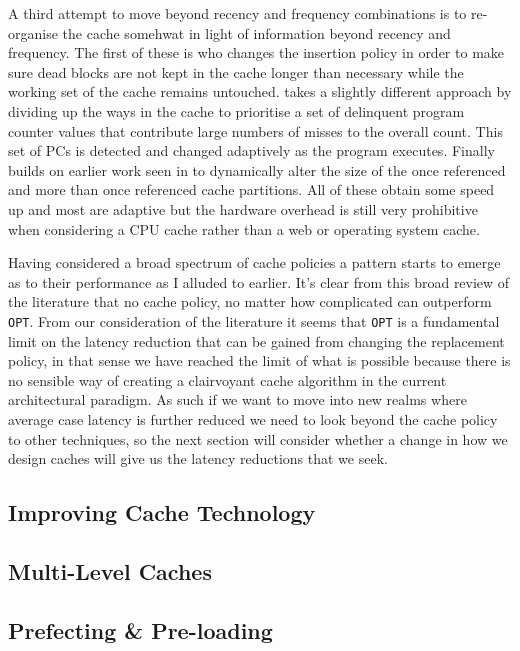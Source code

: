 A third attempt to move beyond recency and frequency combinations is to re-organise the cache somehwat in light of information beyond recency and frequency. The first of these is \citet{chaudhuriPseudoLIFOFoundationNew2009a} who changes the insertion policy in order to make sure dead blocks are not kept in the cache longer than necessary while the working set of the cache remains untouched. \citet{manikantanNUcacheEfficientMulticore2011} takes a slightly different approach by dividing up the ways in the cache to prioritise a set of delinquent program counter values that contribute large numbers of misses to the overall count. This set of PCs is detected and changed adaptively as the program executes. Finally \citet{khanDecoupledDynamicCache2012} builds on earlier work seen in \citet{johnson2QLowOverhead1994} to dynamically alter the size of the once referenced and more than once referenced cache partitions. All of these obtain some speed up and most are adaptive but the hardware overhead is still very prohibitive when considering a CPU cache rather than a web or operating system cache.

Having considered a broad spectrum of cache policies a pattern starts to emerge as to their performance as I alluded to earlier. It's clear from this broad review of the literature that no cache policy, no matter how complicated can outperform \texttt{OPT}. From our consideration of the literature it seems that \texttt{OPT} is a fundamental limit on the latency reduction that can be gained from changing the replacement policy, in that sense we have reached the limit of what is possible because there is no sensible way of creating a clairvoyant cache algorithm in the current architectural paradigm. As such if we want to move into new realms where average case latency is further reduced we need to look beyond the cache policy to other techniques, so the next section will consider whether a change in how we design caches will give us the latency reductions that we seek.


\subsection{Improving Cache Technology}

\subsection{Multi-Level Caches}

\subsection{Prefecting \& Pre-loading}

